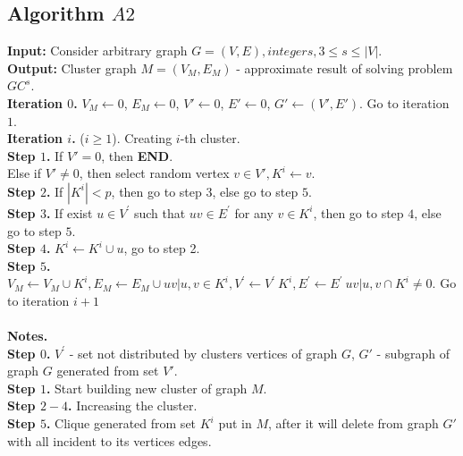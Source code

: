 \documentclass[12pt]{article}
\begin{document}
\subsection*{Algorithm $A2$}
\textbf{Input:} Consider arbitrary graph $ G = (V,E), integer s, 3 \leq s \leq |V|$.
\\ \textbf{Output:} Cluster graph $M = (V_M,E_M)$ - approximate result of solving problem $GC^{s}$.
\\ \textbf{Iteration $0$.} $V_M \leftarrow 0$, $E_M \leftarrow 0$, $V' \leftarrow 0$, $E' \leftarrow 0$, $G' \leftarrow (V',E')$. Go to iteration $1$.
\\ \textbf{Iteration $i$.} ($i \geq 1 $). Creating $i$-th cluster.
\\ \textbf{Step $1$.} If $V'=0$, then \textbf{END}.
\\ Else if $V' \neq 0$, then select random vertex  $v\in V', K^i \leftarrow {v}$.
\\ \textbf{Step $2$.} If $|K^i|<p$, then go to step $3$, else go to step $5$.
\\ \textbf{Step $3$.} If exist $ u \in V^'$ such that $uv \in E^'$ for any $v \in K^i $, then go to step $4$, else go to step $5$. 
\\ \textbf{Step $4$.} $K^i \leftarrow K^i\cup {u}$, go to step 2.
\\ \textbf{Step $5$.} $V_M \leftarrow V_M \cup K^i, E_M \leftarrow E_M \cup { uv | u,v \in K^i }, V^' \leftarrow V^' \ K^i, E^' \leftarrow E^' \ {uv | {u,v} \cap K^i \neq 0}.$ Go to iteration $i+1$
\\
\\ \textbf{Notes.}
\\ \textbf{Step $0$.} $V^'$ - set not distributed by clusters vertices of graph $G$, $G'$ - subgraph of graph $G$ generated from set $V'$.
\\ \textbf{Step $1$.} Start building new cluster of graph $M$.
\\ \textbf{Step $2-4$.} Increasing the cluster.
\\ \textbf{Step $5$.} Clique generated from set $K^i$ put in $M$, after it will delete from graph $G'$ with all incident to its vertices edges.
\end{document}
